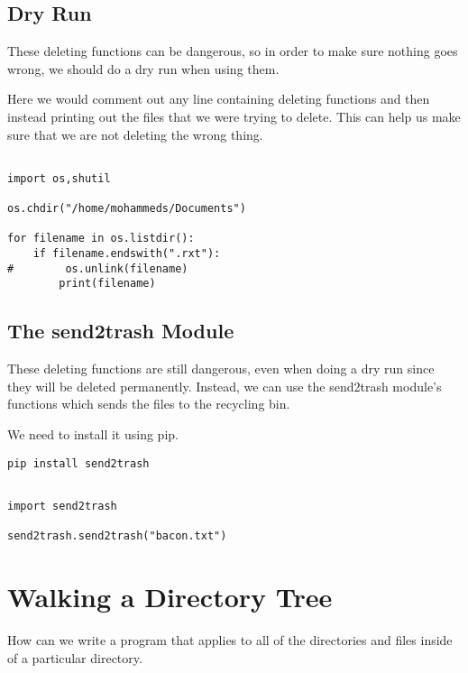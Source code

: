 \documentclass[11pt]{article}
\begin{document}
\subsection{Dry Run}
\label{sec:orgeb144a9}

These deleting functions can be dangerous, so in order to make sure nothing goes wrong, we should do a dry run when using them.

Here we would comment out any line containing deleting functions and then instead printing out the files that we were trying to delete. This can help us make sure that we are not deleting the wrong thing.

\begin{verbatim}

import os,shutil

os.chdir("/home/mohammeds/Documents")

for filename in os.listdir():
    if filename.endswith(".rxt"):
#        os.unlink(filename)
        print(filename)

\end{verbatim}

\subsection{The send2trash Module}
\label{sec:org5570b74}

These deleting functions are still dangerous, even when doing a dry run since they will be deleted permanently. Instead, we can use the send2trash module's functions which sends the files to the recycling bin.

We need to install it using pip.

\begin{verbatim}
pip install send2trash
\end{verbatim}

\begin{verbatim}

import send2trash

send2trash.send2trash("bacon.txt")

\end{verbatim}
\section{Walking a Directory Tree}
\label{sec:orga1e0552}

How can we write a program that applies to all of the directories and files inside of a particular directory.
\end{document}

